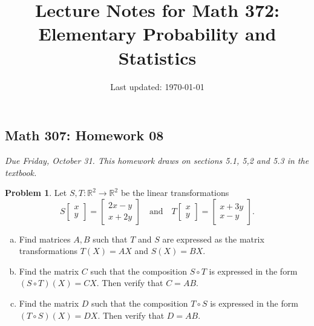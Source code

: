 \documentclass[10pt]{article}
\title{Lecture Notes for Math 372: \\Elementary Probability and Statistics}
\date{Last updated: \today}
\theoremstyle{definition}
\newtheorem{problem}[theorem]{Problem}
\newcommand{\1}[1]{\textbf{1}_{\left[#1\right]}} %
\def\R{\mathbb{R}} %
\begin{document}
\begin{center}
  \section*{Math 307: Homework 08}
  \textit{Due Friday, October 31. This homework draws on sections
    5.1, 5,2 and 5.3 in the textbook.}
\end{center}



\begin{problem}
  Let $S,T:\R^{2} \to \R^{2}$ be the linear transformations
  \begin{equation*}
    S
    \begin{bmatrix}
      x\\y
    \end{bmatrix}
    =
    \begin{bmatrix}
      2x-y\\x+2y
    \end{bmatrix}
    \quad \text{and} \quad
    T
    \begin{bmatrix}
      x\\y
    \end{bmatrix}
    =
    \begin{bmatrix}
      x+3y\\x-y
    \end{bmatrix}.
  \end{equation*}
  \begin{enumerate}[(a)]
    \setlength{\itemsep}{0pt}
    \item Find matrices $A,B$ such that $T$ and $S$ are expressed as the
    matrix transformations $T(X)=AX$ and $S(X) = BX$.
    \item Find the matrix $C$ such that the composition $S\circ T$ is
    expressed in the form $(S\circ T)(X)=CX$. Then verify that $C=AB$.
    \item Find the matrix $D$ such that the composition $T\circ S$ is
    expressed in the form $(T\circ S)(X)=DX$. Then verify that $D=AB$.
  \end{enumerate}
\end{problem}
\end{document}
